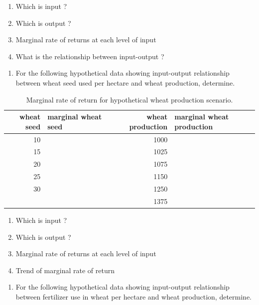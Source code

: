 \documentclass[
]{article}
\providecommand{\tightlist}{%
  \setlength{\itemsep}{0pt}\setlength{\parskip}{0pt}}
\begin{document}
\begin{enumerate}
\def\labelenumi{\alph{enumi}.}
\tightlist
\item
  Which is input ?
\item
  Which is output ?
\item
  Marginal rate of returns at each level of input
\item
  What is the relationship between input-output ?
\end{enumerate}

\begin{enumerate}
\def\labelenumi{\arabic{enumi}.}
\setcounter{enumi}{1}
\tightlist
\item
  For the following hypothetical data showing input-output relationship between wheat seed used per hectare and wheat production, determine.
\end{enumerate}

\begin{table}[H]

\caption{\label{tab:nitrogen-wheat-imr-tab}Marginal rate of return for hypothetical wheat production scenario.}
\centering
\fontsize{8}{10}\selectfont
\begin{tabular}[t]{rlrl}
\toprule
wheat seed & marginal wheat seed & wheat production & marginal wheat production\\
\midrule
10 &  & 1000 & \\
15 &  & 1025 & \\
20 &  & 1075 & \\
25 &  & 1150 & \\
30 &  & 1250 & \\
\addlinespace
35 &  & 1375 & \\
\bottomrule
\end{tabular}
\end{table}

\begin{enumerate}
\def\labelenumi{\alph{enumi}.}
\tightlist
\item
  Which is input ?
\item
  Which is output ?
\item
  Marginal rate of returns at each level of input
\item
  Trend of marginal rate of return
\end{enumerate}

\begin{enumerate}
\def\labelenumi{\arabic{enumi}.}
\setcounter{enumi}{2}
\tightlist
\item
  For the following hypothetical data showing input-output relationship between fertilizer use in wheat per hectare and wheat production, determine.
\end{enumerate}
\end{document}
